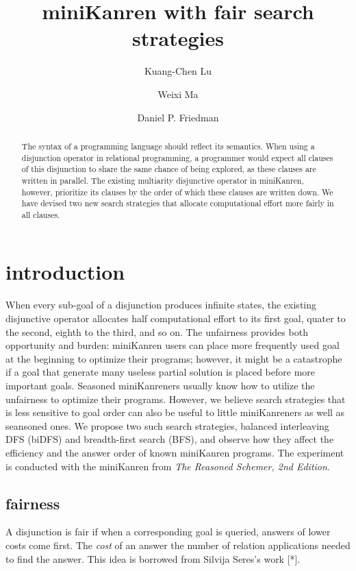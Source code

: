 \documentclass[format=acmlarge, review=true, authordraft=true]{acmart}
\title{miniKanren with fair search strategies}
\author{Kuang-Chen Lu}
\affiliation{Indiana University}
\author{Weixi Ma}
\affiliation{Indiana University}
\author{Daniel P. Friedman}
\affiliation{Indiana University}
\begin{document}
\begin{abstract}

The syntax of a programming language should reflect its semantics. When using a
disjunction operator in relational programming, a programmer would expect all
clauses of this disjunction to share the same chance of being explored, as
these clauses are written in parallel. The existing multiarity disjunctive
operator in miniKanren, however, prioritize its clauses by the order of which
these clauses are written down. We have devised two new search strategies that
allocate computational effort more fairly in all clauses.

\end{abstract}

\maketitle

\section{introduction}

When every sub-goal of a disjunction produces infinite states, the existing 
disjunctive operator allocates half computational effort to its first goal, 
quater to the second, eighth to the third, and so on. The unfairness provides 
both opportunity and burden: miniKanren users can place more frequently used 
goal at the beginning to optimize their programs; however, it might be a 
catastrophe if a goal that generate many useless partial solution is placed 
before more important goals. Seasoned miniKanreners usually know how to utilize 
the unfairness to optimize their programs. However, we believe search strategies 
that is less sensitive to goal order can also be useful to little miniKanreners 
as well as seansoned ones. We propose two such search strategies, balanced 
interleaving DFS (biDFS) and breadth-first search (BFS), and observe how they 
affect the efficiency and the answer order of known miniKanren programs. The 
experiment is conducted with the miniKanren from \textit{The Reasoned Schemer, 
2nd Edition}.

\subsection{fairness}

A disjunction is fair if when a corresponding goal is queried, answers of 
lower costs come first. The \emph{cost} of an answer the number of relation 
applications needed to find the answer. This idea is borrowed from Silvija 
Seres's work [*].
\end{document}
